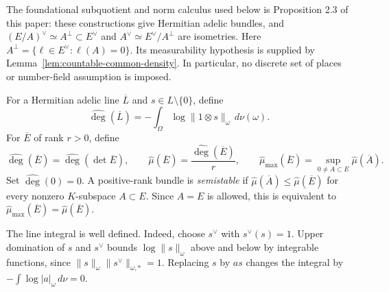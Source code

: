 The foundational subquotient and norm calculus used below is Proposition 2.3
of this paper: these constructions give Hermitian adelic bundles, and
$(E/A)^\vee\simeq A^\perp\subset E^\vee$ and
$A^\vee\simeq E^\vee/A^\perp$ are isometries. Here
$A^\perp=\{\ell\in E^\vee:\ell(A)=0\}$.
Its measurability hypothesis is supplied by
Lemma~\ref{lem:countable-common-density}. In particular, no discrete set of
places or number-field assumption is imposed.

\begin{definition}
\label{def:adelic-slope}
\leanok
For a Hermitian adelic line $\overline L$ and $s\in L\setminus\{0\}$,
define
\[
 \widehat{\deg}(\overline L)
       =-\int_\Omega\log\|1\otimes s\|_\omega\,d\nu(\omega).
\]
For $\overline E$ of rank $r>0$, define
\[
 \widehat{\deg}(\overline E)=\widehat{\deg}(\det\overline E),\qquad
 \widehat\mu(\overline E)=\frac{\widehat{\deg}(\overline E)}r,\qquad
 \widehat\mu_{\max}(\overline E)
       =\sup_{0\ne A\subset E}\widehat\mu(\overline A).
\]
Set $\widehat{\deg}(0)=0$. A positive-rank bundle is \emph{semistable} if
$\widehat\mu(\overline A)\le\widehat\mu(\overline E)$ for every
nonzero $K$-subspace $A\subset E$. Since $A=E$ is allowed, this is
equivalent to $\widehat\mu_{\max}(\overline E)=\widehat\mu(\overline E)$.
\end{definition}

The line integral is well defined. Indeed, choose $s^\vee$ with
$s^\vee(s)=1$. Upper domination of $s$ and $s^\vee$ bounds
$\log\|s\|_\omega$ above and below by integrable functions, since
$\|s\|_\omega\|s^\vee\|_{\omega,*}=1$. Replacing $s$ by $as$
changes the integral by $-\int\log|a|_\omega\,d\nu=0$.

